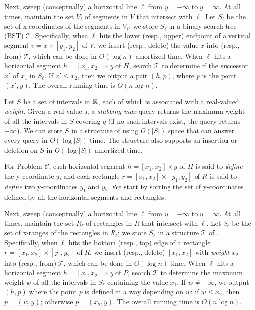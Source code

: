 \documentclass[sigconf]{acmart}
\def\vgap{\vspace{0mm}}
\def\extraspacing{\vspace{1.5mm} \noindent}
\def\T{\mathcal{T}}
\begin{document}
{{{\vgap

Next, sweep (conceptually) a horizontal line $\ell$ from $y = -\infty$ to $y = \infty$. At all times, maintain the set $V_\ell$ of segments in $V$ that intersect with $\ell$. Let $S_\ell$ be the set of x-coordinates of the segments in $V_\ell$; we store $S_\ell$ in a binary search tree (BST) $\T$. Specifically, when $\ell$ hits the lower  (resp., upper) endpoint of a vertical segment $v = x \times [y_1, y_2]$ of $V$, we insert (resp., delete) the value $x$ into (resp., from) $\T$, which can be done in $O(\log n)$ amortized time. When $\ell$ hits a horizontal segment $h = [x_1, x_2] \times y$ of $H$, search $\T$ to determine if the successor $x'$ of $x_1$ in $S_\ell$. If $x' \le x_2$, then we output a pair $(h, p)$, where $p$ is the point $(x', y)$. The overall running time is $O(n \log n)$.

\extraspacing {\bf Algorithm for Problem $\bm{\mathscr{C}}$.} Let $S$ be a set of intervals in $\mathbb{R}$, each of which is associated with a real-valued {\em weight}. Given a real value $q$, a {\em stabbing max} query returns the maximum weight of all the intervals in $S$ covering $q$ (if no such intervals exist, the query returns $-\infty$). We can store $S$ in a structure of \cite{aak+12} using $O(|S|)$ space that can answer every query in $O(\log |S|)$ time. The structure also supports an insertion or deletion on $S$ in $O(\log |S|)$ amortized time.

\vgap

For Problem $\mathscr{C}$, each horizontal segment $h = [x_1, x_2] \times y$ of $H$ is said to {\em define} the y-coordinate $y$, and each rectangle $r = [x_1, x_2] \times [y_1, y_2]$ of $R$ is said to {\em define} two y-coordinates $y_1$ and $y_2$. We start by sorting the set of y-coordinates defined by all the horizontal segments and rectangles.

\vgap

Next, sweep (conceptually) a horizontal line $\ell$ from $y = -\infty$ to $y = \infty$. At all times, maintain the set $R_\ell$ of rectangles in $R$ that intersect with $\ell$. Let $S_\ell$ be the set of x-ranges of the rectangles in $R_\ell$; we store $S_\ell$ in a structure $\T$ of \cite{aak+12}. Specifically, when $\ell$ hits the bottom (resp., top) edge of a rectangle $r = [x_1, x_2] \times [y_1, y_2]$ of $R$, we insert (resp., delete) $[x_1, x_2]$ with {\em weight} $x_2$ into (resp., from) $\T$, which can be done in $O(\log n)$ time. When $\ell$ hits a horizontal segment $h = [x_1, x_2] \times y$ of $P$, search $\T$ to determine the maximum weight $w$ of all the intervals in $S_\ell$ containing the value $x_1$. If $w \ne -\infty$, we output $(h, p)$ where the point $p$ is defined in a way depending on $w$: if $w \le x_2$, then $p = (w, y)$; otherwise $p = (x_2, y)$. The overall running time is $O(n \log n)$.

}}}
\end{document}
